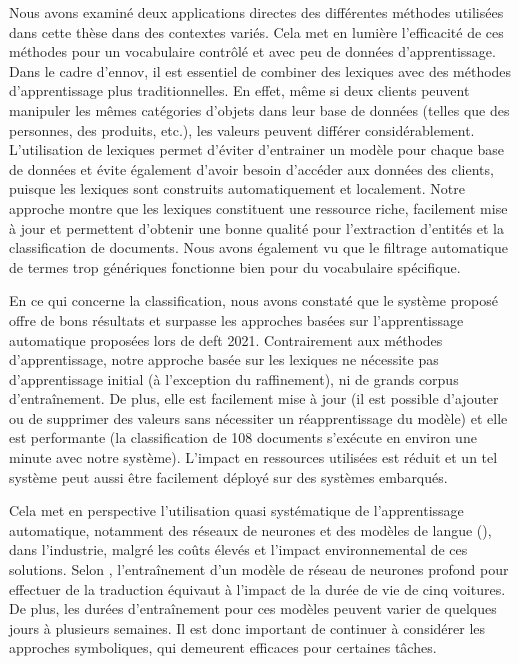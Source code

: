 Nous avons examiné deux applications directes des différentes méthodes utilisées dans cette thèse dans des contextes variés.
Cela met en lumière l'efficacité de ces méthodes pour un vocabulaire contrôlé et avec peu de données d'apprentissage.
Dans le cadre d'\gls{ennov}, il est essentiel de combiner des lexiques avec des méthodes d'apprentissage plus traditionnelles.
En effet, même si deux clients peuvent manipuler les mêmes catégories d'objets dans leur base de données (telles que des personnes, des produits, etc.), les valeurs peuvent différer considérablement.
L'utilisation de lexiques permet d'éviter d'entrainer un modèle pour chaque base de données et évite également d'avoir besoin d'accéder aux données des clients, puisque les lexiques sont construits automatiquement et localement.
Notre approche montre que les lexiques constituent une ressource riche, facilement mise à jour et permettent d'obtenir une bonne qualité pour l'extraction d'entités et la classification de documents.
Nous avons également vu que le filtrage automatique de termes trop génériques fonctionne bien pour du vocabulaire spécifique.

En ce qui concerne la classification, nous avons constaté que le système proposé offre de bons résultats et surpasse les approches basées sur l'apprentissage automatique proposées lors de \gls{deft} 2021.
Contrairement aux méthodes d'apprentissage, notre approche basée sur les lexiques ne nécessite pas d'apprentissage initial (à l'exception du raffinement), ni de grands corpus d'entraînement.
De plus, elle est facilement mise à jour (il est possible d'ajouter ou de supprimer des valeurs sans nécessiter un réapprentissage du modèle) et elle est performante (la classification de \num{108} documents s'exécute en environ une minute avec notre système).
L'impact en ressources utilisées est réduit et un tel système peut aussi être facilement déployé sur des systèmes embarqués.

Cela met en perspective l'utilisation quasi systématique de l'apprentissage automatique, notamment des réseaux de neurones et des modèles de langue (), dans l'industrie, malgré les coûts élevés et l'impact environnemental de ces solutions.
Selon \cite{strubellEnergyPolicyConsiderations2019}, l'entraînement d'un modèle de réseau de neurones profond  pour effectuer de la traduction équivaut à l'impact de la durée de vie de cinq voitures.
De plus, les durées d'entraînement pour ces modèles peuvent varier de quelques jours à plusieurs semaines.
Il est donc important de continuer à considérer les approches symboliques, qui demeurent efficaces pour certaines tâches.

